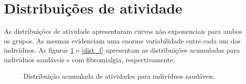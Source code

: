 \documentclass{ufscThesis}
\begin{document}
\section{Distribuições de atividade}

As distribuições de atividade apresentaram curvas não exponenciais para ambos os grupos. As mesmas evidenciam uma enorme variabilidade entre cada um dos indivíduos. As figuras \ref{dist_h} e \ref{dist_f} apresentam as distribuições acumuladas para indivíduos saudáveis e com fibromialgia, respectivamente.

\begin{figure}[!h]
\center
{}
\quad
{}
\caption{Distribuição acumulada de atividades para indivíduos saudáveis.}
\label{dist_h}
\end{figure}
\end{document}
